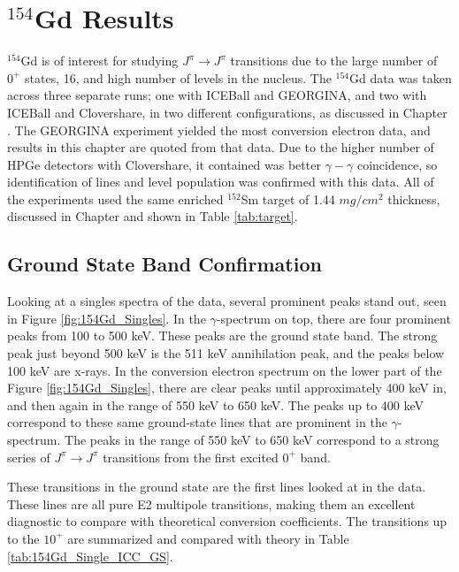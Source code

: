 \chapter{$^{154}$Gd Results}
\label{chap:154Gd}

$^{154}$Gd is of interest for studying $J^\pi\rightarrow J^\pi$ transitions due to the large number of $0^+$ states, 16, and high number of levels in the nucleus. The $^{154}$Gd data was taken across three separate runs; one with ICEBall and GEORGINA, and two with ICEBall and Clovershare, in two different configurations, as discussed in Chapter \label{chap:setup}. The GEORGINA experiment yielded the most conversion electron data, and results in this chapter are quoted from that data. Due to the higher number of HPGe detectors with Clovershare, it contained was better $\gamma-\gamma$ coincidence, so identification of lines and level population was confirmed with this data. All of the experiments used the same enriched $^{152}$Sm target of 1.44 $mg/cm^2$ thickness, discussed in Chapter \label{chap:setup} and shown in Table \ref{tab:target}.

\section{Ground State Band Confirmation}
\label{sec:154GS_Confirm}

Looking at a singles spectra of the data, several prominent peaks stand out, seen in Figure \ref{fig:154Gd_Singles}. In the $\gamma$-spectrum on top, there are four prominent peaks from 100 to 500 keV. These peaks are the ground state band. The strong peak just beyond 500 keV is the 511 keV annihilation peak, and the peaks below 100 keV are x-rays. In the conversion electron spectrum on the lower part of the Figure \ref{fig:154Gd_Singles}, there are clear peaks until approximately 400 keV in, and then again in the range of 550 keV to 650 keV. The peaks up to 400 keV correspond to these same ground-state lines that are prominent in the $\gamma$-spectrum. The peaks in the range of 550 keV to 650 keV correspond to a strong series of $J^{\pi}\rightarrow J^{\pi}$ transitions from the first excited $0^+$ band.



These transitions in the ground state are the first lines looked at in the data. These lines are all pure E2 multipole transitions, making them an excellent diagnostic to compare with theoretical conversion coefficients. The transitions up to the $10^+$ are summarized and compared with theory in Table \ref{tab:154Gd_Single_ICC_GS}.

